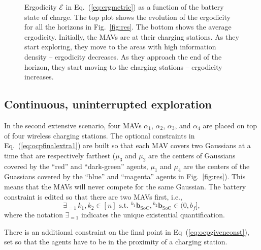 \documentclass[letterpaper,10pt,conference,twoside]{IEEEtran}
\theoremstyle{definition}
\begin{document}
\begin{figure}[t!]
  \begin{minipage}[t!]{.5\columnwidth}
    \vspace*{-.2cm}
    
  \end{minipage}
  \begin{minipage}[c]{.48\columnwidth}
    \vspace*{.05cm}
    \caption{Ergodicity $\mathcal{E}$ in Eq.~(\ref{eq:ergmetric}) as a function of the battery state of charge. The top plot shows the evolution of the ergodicity for all the horizons in Fig.~\ref{fig:res}. The bottom shows the average ergodicity. Initially, the MAVs are at their charging stations. As they start exploring, they move to the areas with high information density -- ergodicity decreases. As they approach the end of the horizon, they start moving to the charging stations -- ergodicity increases.}
    \label{fig:ergo}
  \end{minipage}
  \vspace*{-.3cm}
\end{figure}

\subsection*{Continuous, uninterrupted exploration}
\noindent
In the second extensive scenario, four MAVs $\alpha_1$, $\alpha_2$, $\alpha_3$, and $\alpha_4$ are placed on top of four wireless charging stations. The optional constraints in Eq.~(\ref{eq:ocpfinalextra1}) are built so that each MAV covers two Gaussians at a time that are respectively farthest ($\mu_3$ and $\mu_2$ are the centers of Gaussians covered by the ``red'' and ``dark-green'' agents, $\mu_1$ and $\mu_4$ are the centers of the Guassians covered by the ``blue'' and ``magenta'' agents in Fig.~\ref{fig:res}). This means that the MAVs will never compete for the same Gaussian. The battery constraint is edited so that there are two MAVs first, i.e.,
\begin{equation}
\exists_{=1}\, k_1,k_2\in[n]\text{ s.t. }{}^{k_1} \mathbf{b}_{\text{SoC}},{}^{k_2} \mathbf{b}_{\text{SoC}}\in(0,b_f],
\end{equation} 
where the notation $\exists_{=1}$ indicates the unique existential quantification.

There is an additional constraint on the final point in Eq~(\ref{eq:ocpgivenconst}), set so that the agents have to be in the proximity of a charging station. %
\end{document}
